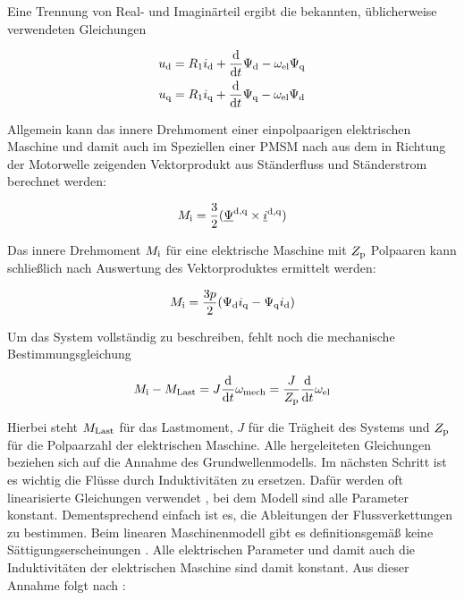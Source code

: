 Eine Trennung von Real- und Imaginärteil ergibt die bekannten, üblicherweise verwendeten Gleichungen \autocite{schroder2001}

	\begin{align}
		u_{\mathrm{d}} &= R_{\mathrm{1}}i_{\mathrm{d}} + \frac{\mathrm{d}}{\mathrm{d}t}\Psi_{\mathrm{d}}-\omega_{\mathrm{el}}\Psi_{\mathrm{q}} \label{eqn:ud-gleichung}\\
		u_{\mathrm{q}} &= R_{\mathrm{1}}i_{\mathrm{q}} + \frac{\mathrm{d}}{\mathrm{d}t}\Psi_{\mathrm{q}}-\omega_{\mathrm{el}}\Psi_{\mathrm{d}} \label{eqn:uq-gleichung}
	\end{align}

Allgemein kann das innere Drehmoment einer einpolpaarigen elektrischen Maschine und damit auch im Speziellen einer PMSM nach \textcite{kellner2012} aus dem in Richtung der Motorwelle zeigenden Vektorprodukt aus Ständerfluss und Ständerstrom berechnet werden:

\begin{align}
	M_{\mathrm{i}} = \frac{3}{2}(\underline{\Psi}^{\mathrm{d,q}} \times \underline{i}^{\mathrm{d,q}}) 
\end{align}

Das innere Drehmoment $M_{\mathrm{i}}$ für eine elektrische Maschine mit $Z_{\mathrm{p}}$ Polpaaren kann schließlich nach Auswertung des Vektorproduktes ermittelt werden:

	\begin{align}
M_{\mathrm{i}} = \frac{3p}{2} ( \Psi_{\mathrm{d}}i_{\mathrm{q}} - \Psi_{\mathrm{q}}i_{\mathrm{d}} ) \label{eqn:mi-gleichung}
	\end{align}

Um das System vollständig zu beschreiben, fehlt noch die mechanische Bestimmungsgleichung

\begin{align}
	M_{\mathrm{i}} - M_{\mathrm{Last}} = J \frac{\mathrm{d}}{\mathrm{d}t}\omega_{\mathrm{mech}} = \frac{J}{Z_{\mathrm{p}}} \frac{\mathrm{d}}{\mathrm{d}t}\omega_{\mathrm{el}} \label{eqn:mechanische-gleichung}
\end{align}

Hierbei steht $M_{\mathrm{Last}}$ für das Lastmoment, $J$ für die Trägheit des Systems und $Z_{\mathrm{p}}$ für die Polpaarzahl der elektrischen Maschine.
Alle hergeleiteten Gleichungen beziehen sich auf die Annahme des Grundwellenmodells.
Im nächsten Schritt ist es wichtig die Flüsse durch Induktivitäten zu ersetzen.
Dafür werden oft linearisierte Gleichungen verwendet \autocite{schroder2001}, bei dem Modell sind alle Parameter konstant.
Dementsprechend einfach ist es, die Ableitungen der Flussverkettungen zu bestimmen.
Beim linearen Maschinenmodell gibt es definitionsgemäß keine Sättigungserscheinungen \autocites{mullerII2008}{schroder2001}.
Alle elektrischen Parameter und damit auch die Induktivitäten der elektrischen Maschine sind damit konstant.
Aus dieser Annahme folgt nach \autocite{schroder2001}:

